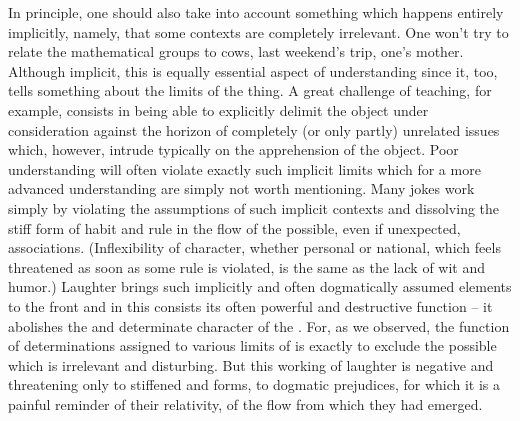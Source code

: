 In principle, one should also take into account something which happens entirely
implicitly, namely, that some contexts are completely irrelevant. One won't try
to relate the mathematical groups to cows, last weekend's trip, one's mother.
Although implicit, this is equally essential aspect of understanding since it,
too, tells something about the limits of the thing. A great challenge of
teaching, for example, consists in being able to explicitly delimit the object
under consideration against the horizon of completely (or only partly) unrelated
issues which, however, intrude typically on the apprehension of the object. Poor
understanding will often violate exactly such implicit limits which for a more
advanced understanding are simply not worth mentioning. Many jokes work simply
by violating the assumptions of such implicit contexts and dissolving the stiff
form of habit and rule in the flow of the possible, even if unexpected,
associations. (Inflexibility of character, whether personal or national, which
feels threatened as soon as some rule is violated, is the same as the lack of
wit and humor.) Laughter brings such implicitly and often dogmatically assumed
elements to the front and in this consists its often powerful and destructive
function -- it abolishes the  and determinate character of the
. For, as we observed, the function of  determinations
assigned to various limits of  is exactly to exclude the
possible which is irrelevant and disturbing.  But this working of laughter is
negative and threatening only to stiffened and  forms, to dogmatic
prejudices, for which it is a painful reminder of their relativity, of the
 flow from which they had emerged.

